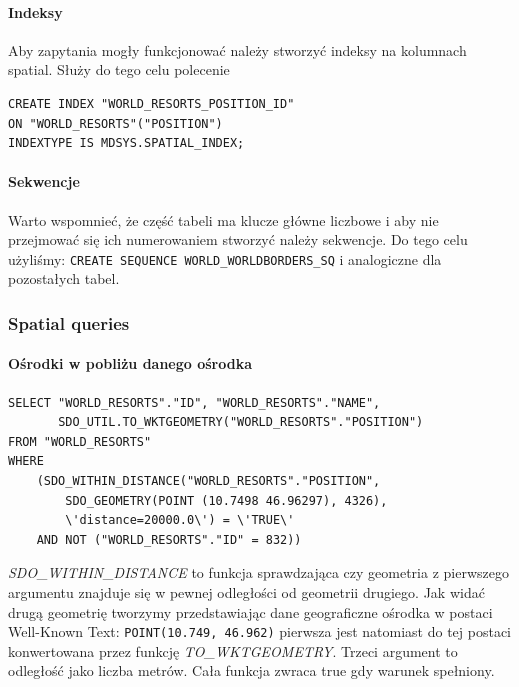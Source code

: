 \documentclass[12pt]{article}
\begin{document}
\paragraph{Indeksy}
Aby zapytania mogły funkcjonować należy stworzyć indeksy na kolumnach spatial. Służy do tego celu polecenie
\begin{verbatim}
CREATE INDEX "WORLD_RESORTS_POSITION_ID"
ON "WORLD_RESORTS"("POSITION")
INDEXTYPE IS MDSYS.SPATIAL_INDEX;
\end{verbatim}

\paragraph{Sekwencje}
Warto wspomnieć, że część tabeli ma klucze główne liczbowe i aby nie przejmować się ich numerowaniem
stworzyć należy sekwencje. Do tego celu użyliśmy:
\texttt{CREATE SEQUENCE WORLD\_WORLDBORDERS\_SQ}
i analogiczne dla pozostałych tabel.

\subsubsection{Spatial queries}
\paragraph{Ośrodki w pobliżu danego ośrodka}
\begin{verbatim}
SELECT "WORLD_RESORTS"."ID", "WORLD_RESORTS"."NAME",
       SDO_UTIL.TO_WKTGEOMETRY("WORLD_RESORTS"."POSITION")
FROM "WORLD_RESORTS"
WHERE
    (SDO_WITHIN_DISTANCE("WORLD_RESORTS"."POSITION",
        SDO_GEOMETRY(POINT (10.7498 46.96297), 4326),
        \'distance=20000.0\') = \'TRUE\'
    AND NOT ("WORLD_RESORTS"."ID" = 832))
\end{verbatim}
\emph{SDO\_WITHIN\_DISTANCE} to funkcja sprawdzająca czy geometria z pierwszego argumentu znajduje się w pewnej
odległości od geometrii drugiego. Jak widać drugą geometrię tworzymy przedstawiając dane geograficzne ośrodka
w postaci Well-Known Text: \texttt{POINT(10.749, 46.962)} pierwsza jest natomiast do tej postaci konwertowana
przez funkcję \emph{TO\_WKTGEOMETRY}. Trzeci argument to odległość jako liczba metrów. Cała
funkcja zwraca true gdy warunek spełniony.
\end{document}
